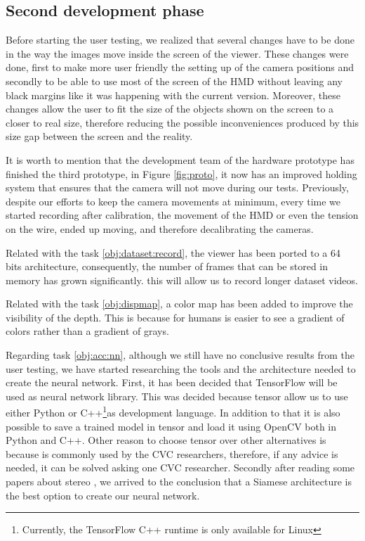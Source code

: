 \documentclass[10pt,a4paper,twocolumn,twoside]{article}
\begin{document}
	\subsection{Second development phase}
	
	Before starting the user testing, we realized that several changes have to be done in the way the images move inside the screen of the viewer. These changes were done, first to make more user friendly the setting up of the camera positions and secondly to be able to use most of the screen of the HMD without leaving any black margins like it was happening with the current version. Moreover, these changes allow the user to fit the size of the objects shown on the screen to a closer to real size, therefore reducing the possible inconveniences produced by this size gap between the screen and the reality.  

	It is worth to mention that the development team of the hardware prototype has finished the third prototype, in Figure \ref{fig:proto}, it now has an improved holding system that ensures that the camera will not move during our tests. Previously, despite our efforts to keep the camera movements at minimum, every time we started recording after calibration, the movement of the HMD or even the tension on the wire, ended up moving, and therefore decalibrating the cameras.   
	
	Related with the task \ref{obj:dataset:record}, the viewer has been ported to a 64 bits architecture, consequently, the number of frames that can be stored in memory has grown significantly. this will allow us to record longer dataset videos.
	
	Related with the task \ref{obj:dispmap}, a color map has been added to improve the visibility of the depth. This is because for humans is easier to see a gradient of colors rather than a gradient of grays. 
	
	Regarding task \ref{obj:acc:nn}, although we still have no conclusive results from the user testing, we have started researching the tools and the architecture needed to create the neural network. 
	First, it has been decided that TensorFlow \cite{web:tensor} will be used as neural network library. This was decided because tensor allow us to use either Python or C++\footnote{Currently, the TensorFlow C++ runtime is only available for Linux}as development language. In addition to that it is also possible to save a trained model in tensor and load it using OpenCV both in Python and C++. Other reason to choose tensor over other alternatives is because is commonly used by the CVC researchers, therefore, if any advice is needed, it can be solved asking one CVC researcher. 
	Secondly after reading some papers about stereo \cite{redfelipeSintesisStereo},\cite{efficientStereoMatcher} we arrived to the conclusion that a Siamese architecture is the best option to create our neural network. %
	
\end{document}
